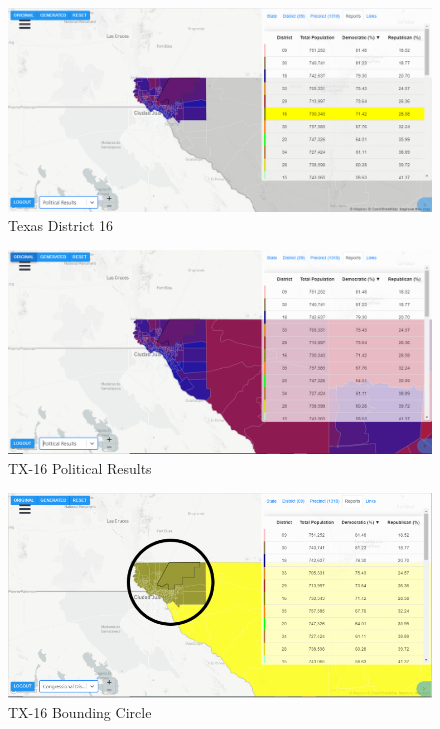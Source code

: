 \documentclass[letterpaper]{article}
\begin{document}
\begin{figure}[H]
	\includegraphics[width=\linewidth]{./figures/TX-16.png}
	\caption{Texas District 16}
	\label{fig:tx16border}
\end{figure}

\begin{figure}[H]
	\includegraphics[width=\linewidth]{./figures/TX-16-SurroundingArea.png}
	\caption{TX-16 Political Results}
	\label{fig:tx16political}
\end{figure}

\begin{figure}[H]
	\includegraphics[width=\linewidth]{./figures/TX-16-BoundingCircle.png}
	\caption{TX-16 Bounding Circle}
	\label{fig:tx16boundingCircle}
\end{figure}
\end{document}
